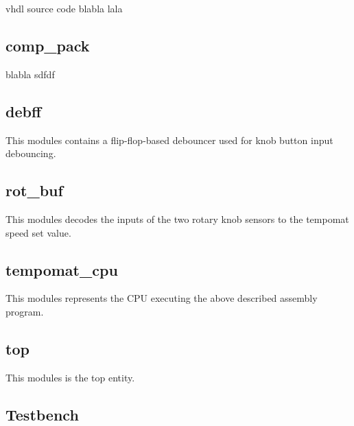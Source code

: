 \documentclass[a4paper,10pt]{scrartcl}
\begin{document}
vhdl source code blabla lala

\subsection{comp\_pack}
blabla sdfdf



\subsection{debff}
This modules contains a flip-flop-based debouncer used for knob button input debouncing. 





\subsection{rot\_buf}
This modules decodes the inputs of the two rotary knob sensors to the tempomat speed set value. 





\subsection{tempomat\_cpu}
This modules represents the CPU executing the above described assembly program. 





\subsection{top}
This modules is the top entity. 







\subsection{Testbench}
\label{sec:bench}
\end{document}
